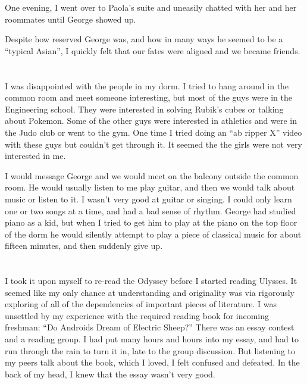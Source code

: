One evening, I went over to Paola's suite and uneasily chatted with her and her
roommates until George showed up.

Despite how reserved George was, and how in many ways he seemed to be a
``typical Asian'', I quickly felt that our fates were aligned and we became
friends.

\section{}

I was disappointed with the people in my dorm.  I tried to hang around in the
common room and meet someone interesting, but most of the guys were in the
Engineering school.  They were interested in solving Rubik's cubes or talking
about Pokemon.  Some of the other guys were interested in athletics and were in
the Judo club or went to the gym.  One time I tried doing an ``ab ripper X''
video with these guys but couldn't get through it.  It seemed the the girls
were not very interested in me.

I would message George and we would meet on the balcony outside the common room.
He would usually listen to me play guitar, and then we would talk about music
or listen to it.  I wasn't very good at guitar or singing.  I could only learn
one or two songs at a time, and had a bad sense of rhythm.  George had studied
piano as a kid, but when I tried to get him to play at the piano on the top
floor of the dorm he would silently attempt to play a piece of classical music
for about fifteen minutes, and then suddenly give up.  

\section{}

I took it upon myself to re-read the Odyssey before I started reading Ulysses.
It seemed like my only chance at understanding and originality was via
rigorously exploring of all of the dependencies of important pieces of
literature.  I was unsettled by my experience with the required reading book for
incoming freshman: ``Do Androids Dream of Electric Sheep?'' There was an essay
contest and a reading group.  I had put many hours and hours into my essay, and
had to run through the rain to turn it in, late to the group discussion.  But
listening to my peers talk about the book, which I loved, I felt confused and
defeated.  In the back of my head, I knew that the essay wasn't very good.

